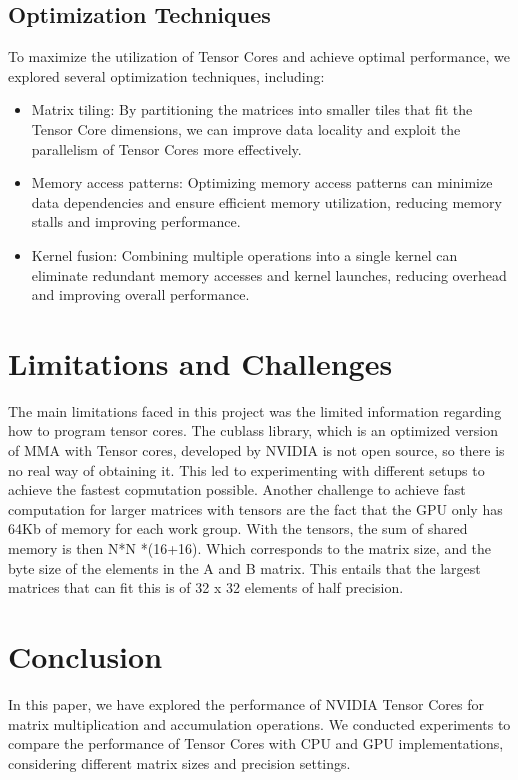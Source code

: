 \documentclass[conference]{IEEEtran}
\begin{document}
  \subsection{Optimization Techniques}\label{sec:optimization-techniques}
  
  To maximize the utilization of Tensor Cores and achieve optimal performance, we explored several optimization techniques, including:
  
  \begin{itemize}
    \item Matrix tiling: By partitioning the matrices
    into smaller tiles that fit the Tensor Core dimensions, we can improve data locality 
    and exploit the parallelism of Tensor Cores more effectively.
    \item Memory access patterns: Optimizing memory access patterns can minimize data 
    dependencies and ensure efficient memory utilization, reducing memory stalls and improving 
    performance.
    \item Kernel fusion: Combining multiple operations into a single kernel can eliminate 
    redundant memory accesses and kernel launches, reducing overhead and improving overall performance.
    
  \end{itemize}
  
  \section{Limitations and Challenges}\label{sec:limitations-challenges}
  The main limitations faced in this project was the limited information regarding how to program tensor cores.
  The cublass library, which is an optimized version of MMA with Tensor cores, developed by NVIDIA is not open source,
  so there is no real way of obtaining it. This led to experimenting with different setups to achieve the fastest copmutation possible.
  Another challenge to achieve fast computation for larger matrices with tensors are the fact that the GPU 
  only has 64Kb of memory for each work group. With the tensors, the sum of shared memory is then N*N *(16+16).
  Which corresponds to the matrix size, and the byte size of the elements in the A and B matrix. This entails that the 
  largest matrices that can fit this is of 32 x 32 elements of half precision.


  \section{Conclusion}\label{sec:conclusion}
  
  In this paper, we have explored the performance of NVIDIA Tensor Cores for matrix multiplication and accumulation operations. 
  We conducted experiments to compare the performance of Tensor Cores with CPU and GPU implementations, 
  considering different matrix sizes and precision settings.
  



\end{document}
